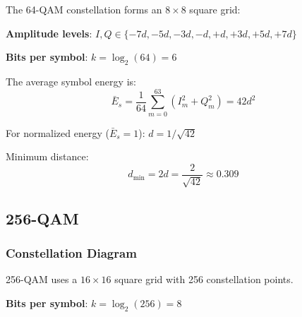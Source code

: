 The 64-QAM constellation forms an $8 \times 8$ square grid:

\begin{center}
\end{center}

\textbf{Amplitude levels}: $I, Q \in \{-7d, -5d, -3d, -d, +d, +3d, +5d, +7d\}$

\textbf{Bits per symbol}: $k = \log_2(64) = 6$

The average symbol energy is:
\begin{equation}
\bar{E}_s = \frac{1}{64}\sum_{m=0}^{63} (I_m^2 + Q_m^2) = 42d^2
\label{eq:64qam-energy}
\end{equation}

For normalized energy ($\bar{E}_s = 1$): $d = 1/\sqrt{42}$

Minimum distance:
\begin{equation}
d_{\min} = 2d = \frac{2}{\sqrt{42}} \approx 0.309
\label{eq:64qam-distance}
\end{equation}

\subsection{256-QAM}

\subsubsection{Constellation Diagram}

256-QAM uses a $16 \times 16$ square grid with 256 constellation points.

\textbf{Bits per symbol}: $k = \log_2(256) = 8$

